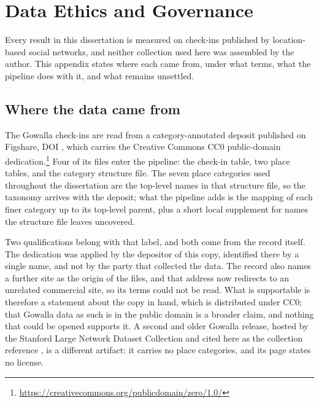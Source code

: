 
\chapter{Data Ethics and Governance}
\label{apx:ethics}

Every result in this dissertation is measured on check-ins published by location-based
social networks, and neither collection used here was assembled by the author. This
appendix states where each came from, under what terms, what the pipeline does with it,
and what remains unsettled.

\section{Where the data came from}

The Gowalla check-ins are read from a category-annotated deposit published on Figshare,
DOI , which carries the Creative Commons CC0
public-domain dedication.\footnote{\url{https://creativecommons.org/publicdomain/zero/1.0/}}
Four of its files enter the pipeline: the check-in table, two place tables, and the
category structure file. The seven place categories used throughout the dissertation are
the top-level names in that structure file, so the taxonomy arrives with the deposit;
what the pipeline adds is the mapping of each finer category up to its top-level parent,
plus a short local supplement for names the structure file leaves uncovered.

Two qualifications belong with that label, and both come from the record itself. The
dedication was applied by the depositor of this copy, identified there by a single name,
and not by the party that collected the data. The record also names a further site as
the origin of the files, and that address now redirects to an unrelated commercial site,
so its terms could not be read. What is supportable is therefore a statement about the copy in hand,
which is distributed under CC0; that Gowalla data as such is in the public domain is a
broader claim, and nothing that could be opened supports it. A second and older Gowalla
release, hosted by the Stanford Large Network Dataset Collection and cited here as the
collection reference \cite{cho2011gowalla,jure2014snap}, is a different artifact: it
carries no place categories, and its page states no license.

